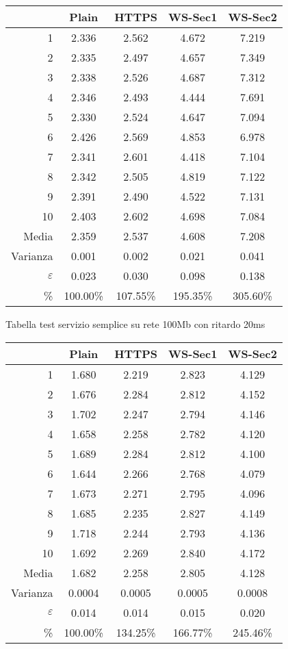 \begin{small}\begin{longtable}{|r|c|c|c|c|}
\hline\hline
&Plain&HTTPS&WS-Sec1&WS-Sec2\\
\hline\hline
1&2.336&2.562&4.672&7.219\\
\hline
2&2.335&2.497&4.657&7.349\\
\hline
3&2.338&2.526&4.687&7.312\\
\hline
4&2.346&2.493&4.444&7.691\\
\hline
5&2.330&2.524&4.647&7.094\\
\hline
6&2.426&2.569&4.853&6.978\\
\hline
7&2.341&2.601&4.418&7.104\\
\hline
8&2.342&2.505&4.819&7.122\\
\hline
9&2.391&2.490&4.522&7.131\\
\hline
10&2.403&2.602&4.698&7.084\\
\hline\hline
Media&2.359&2.537&4.608&7.208\\
\hline
Varianza&0.001&0.002&0.021&0.041\\
\hline
$\varepsilon$&0.023&0.030&0.098&0.138\\
\hline
\%&100.00\%&107.55\%&195.35\%&305.60\%\\
\hline\hline
\end{longtable}\end{small}\begin{small}

Tabella test servizio semplice su rete 100Mb con ritardo 20ms \\

\begin{longtable}{|r|c|c|c|c|}
\hline\hline
&Plain&HTTPS&WS-Sec1&WS-Sec2\\
\hline\hline
1&1.680&2.219&2.823&4.129\\
\hline
2&1.676&2.284&2.812&4.152\\
\hline
3&1.702&2.247&2.794&4.146\\
\hline
4&1.658&2.258&2.782&4.120\\
\hline
5&1.689&2.284&2.812&4.100\\
\hline
6&1.644&2.266&2.768&4.079\\
\hline
7&1.673&2.271&2.795&4.096\\
\hline
8&1.685&2.235&2.827&4.149\\
\hline
9&1.718&2.244&2.793&4.136\\
\hline
10&1.692&2.269&2.840&4.172\\
\hline\hline
Media&1.682&2.258&2.805&4.128\\
\hline
Varianza&0.0004&0.0005&0.0005&0.0008\\
\hline
$\varepsilon$&0.014&0.014&0.015&0.020\\
\hline
\%&100.00\%&134.25\%&166.77\%&245.46\%\\
\hline\hline
\end{longtable}\end{small}


